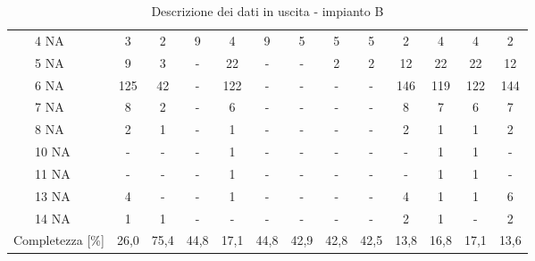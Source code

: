 \begin{sidewaystable}
\begin{center}
\begin{tabular}{|ll|c|c|c|c|c|c|c|c|c|c|c|c|}
		& 4 NA       & 3    & 2    & 9    & 4     & 9    & 5    & 5      & 5      & 2     & 4     & 4     & 2       \\ \cline{3-14} 
		& 5 NA       & 9    & 3    & -    & 22    & -    & -    & 2      & 2      & 12    & 22    & 22    & 12      \\ \cline{3-14} 
		& 6 NA       & 125  & 42   & -    & 122   & -    & -    & -      & -      & 146   & 119   & 122   & 144     \\ \cline{3-14} 
		& 7 NA       & 8    & 2    & -    & 6     & -    & -    & -      & -      & 8     & 7     & 6     & 7       \\ \cline{3-14} 
		& 8 NA       & 2    & 1    & -    & 1     & -    & -    & -      & -      & 2     & 1     & 1     & 2       \\ \cline{3-14} 
		& 10 NA      & -    & -    & -    & 1     & -    & -    & -      & -      & -     & 1     & 1     & -       \\ \cline{3-14} 
		& 11 NA      & -    & -    & -    & 1     & -    & -    & -      & -      & -     & 1     & 1     & -       \\ \cline{3-14} 
		& 13 NA      & 4    & -    & -    & 1     & -    & -    & -      & -      & 4     & 1     & 1     & 6       \\ \cline{3-14} 
		& 14 NA      & 1    & 1    & -    & -     & -    & -    & -      & -      & 2     & 1     & -     & 2       \\ \hline
		\multicolumn{2}{|l|}{Completezza {[}\%{]}}       & 26,0 & 75,4 & 44,8 & 17,1  & 44,8 & 42,9 & 42,8   & 42,5   & 13,8  & 16,8  & 17,1  & 13,6    \\ \hline
	\end{tabular}
	\caption{Descrizione dei dati in uscita - impianto B}
	\label{tab:c_NAout}
\end{center}
\end{sidewaystable}



